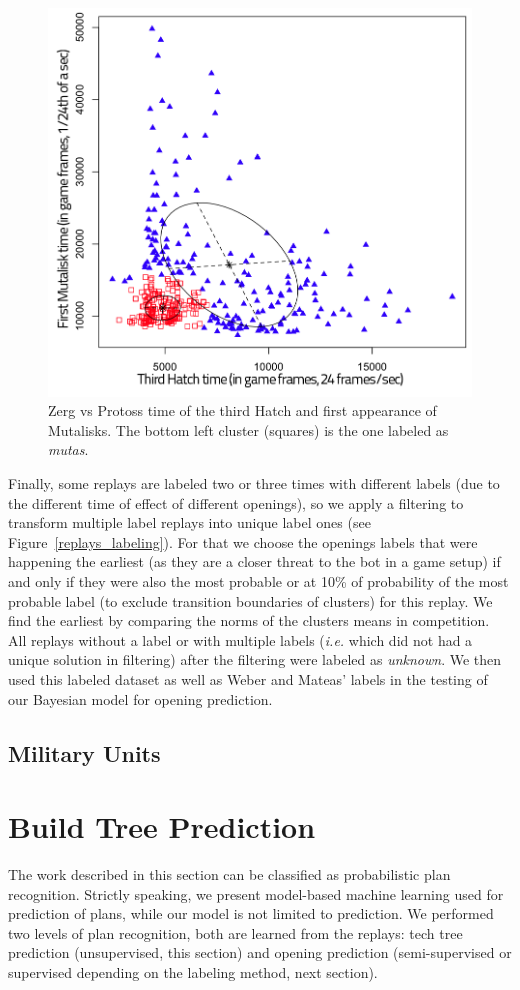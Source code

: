 \begin{figure}[htp]
\centerline{\includegraphics[width=0.7\columnwidth]{images/ZvPmutas.png}}
\caption{Zerg vs Protoss time of the third Hatch and first appearance of Mutalisks. The bottom left cluster (squares) is the one labeled as \textit{mutas}.}
\label{ZvPmutas}
\end{figure}

Finally, some replays are labeled two or three times with different labels (due to the different time of effect of different openings), so we apply a filtering to transform multiple label replays into unique label ones (see Figure~\ref{replays_labeling}). For that we choose the openings labels that were happening the earliest (as they are a closer threat to the bot in a game setup) if and only if they were also the most probable or at 10\% of probability of the most probable label (to exclude transition boundaries of clusters) for this replay. We find the earliest by comparing the norms of the clusters means in competition. All replays without a label or with multiple labels (\textit{i.e.} which did not had a unique solution in filtering) after the filtering were labeled as \textit{unknown}. We then used this labeled dataset as well as Weber and Mateas' labels in the testing of our Bayesian model for opening prediction.


\subsection{Military Units}
\label{sec:militaryunits}

\section{Build Tree Prediction}
\label{sec:strategyprediction}
The work described in this section can be classified as probabilistic plan recognition. Strictly speaking, we present model-based machine learning used for prediction of plans, while our model is not limited to prediction. We performed two levels of plan recognition, both are learned from the replays: tech tree prediction (unsupervised, this section) and opening prediction (semi-supervised or supervised depending on the labeling method, next section).

